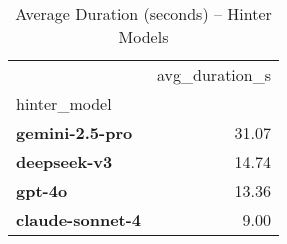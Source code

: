 \begin{table}
\caption{Average Duration (seconds) – Hinter Models}
\label{tab:Core-300_AvgDuration_by_Hinter}
\begin{tabular}{lr}
\toprule
 & avg_duration_s \\
hinter_model &  \\
\midrule
\textbf{gemini-2.5-pro} & 31.07 \\
\textbf{deepseek-v3} & 14.74 \\
\textbf{gpt-4o} & 13.36 \\
\textbf{claude-sonnet-4} & 9.00 \\
\bottomrule
\end{tabular}
\end{table}
